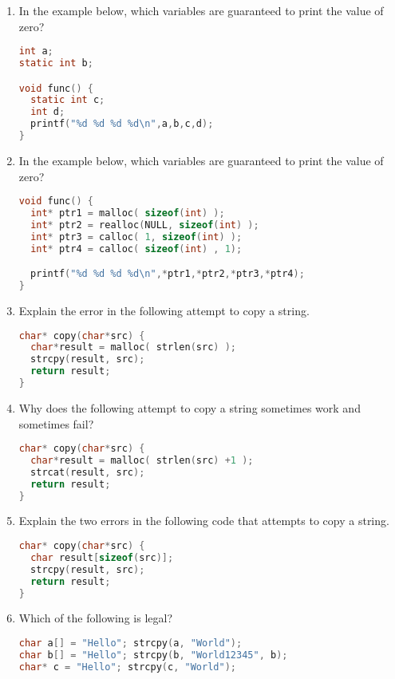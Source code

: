 \begin{enumerate}

\item In the example below, which variables are guaranteed to print the value of zero?

\begin{lstlisting}[language=C]
int a;
static int b;

void func() {
  static int c;
  int d;
  printf("%d %d %d %d\n",a,b,c,d);
}
\end{lstlisting}

\item In the example below, which variables are guaranteed to print the value of zero?

\begin{lstlisting}[language=C]
void func() {
  int* ptr1 = malloc( sizeof(int) );
  int* ptr2 = realloc(NULL, sizeof(int) );
  int* ptr3 = calloc( 1, sizeof(int) );
  int* ptr4 = calloc( sizeof(int) , 1);

  printf("%d %d %d %d\n",*ptr1,*ptr2,*ptr3,*ptr4);
}
\end{lstlisting}

\item Explain the error in the following attempt to copy a string.

\begin{lstlisting}[language=C]
char* copy(char*src) {
  char*result = malloc( strlen(src) );
  strcpy(result, src);
  return result;
}
\end{lstlisting}

\item Why does the following attempt to copy a string sometimes work and sometimes fail?

\begin{lstlisting}[language=C]
char* copy(char*src) {
  char*result = malloc( strlen(src) +1 );
  strcat(result, src);
  return result;
}
\end{lstlisting}

\item Explain the two errors in the following code that attempts to copy a string.

\begin{lstlisting}[language=C]
char* copy(char*src) {
  char result[sizeof(src)];
  strcpy(result, src);
  return result;
}
\end{lstlisting}

\item Which of the following is legal?

\begin{lstlisting}[language=C]
char a[] = "Hello"; strcpy(a, "World");
char b[] = "Hello"; strcpy(b, "World12345", b);
char* c = "Hello"; strcpy(c, "World");
\end{lstlisting}


\end{enumerate}

